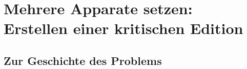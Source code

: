 
\chapter[Mehrere Apparate setzen: Erstellen einer kritischen Edition]{Mehrere Apparate setzen:\\Erstellen einer kritischen Edition}




\label{reledmac}


\newcommand\vari[3][]{%
\edtext{#2}{%
  \if$#1$\lemma{\gkk{#2}}\else\lemma{\gkk{#1}}\fi
  \Cfootnote{#3}}}

\newcommand\quell[3][]{%
\edtext{#2}{%
  \if$#1$\lemma{\gkk{#2}}\else\lemma{\gkk{#1}}\fi
  \Bfootnote{#3}}}

\newsavebox\bspbox
\newenvironment{reledmacbsp}[1]{%
  \begin{minipage}[t]{0.95\linewidth}
  \beginnumbering
  #1%
  \pstart[\subsubsection*{Strabons Geographika XIV 5,1}]%
}%
{%
  \pend
  \stopmsdata
  \endnumbering
  \end{minipage}%
}

\newcommand\bsplineenum{\firstlinenum{2}\linenumincrement{2}}

\setcounter{alteSeite}{269}
\newcommand\alteSeite{{|\ledsidenote{\emph{T}~\thealteSeite}}}%

\VerbatimFootnotes
\DefineShortVerb{\+}

\section{Zur Geschichte des Problems}

